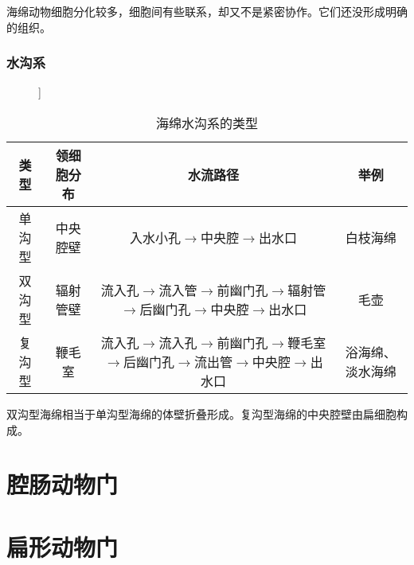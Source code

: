 海绵动物细胞分化较多，细胞间有些联系，却又不是紧密协作。它们还没形成明确的组织。

\subsubsection{水沟系}

\begin{figure}[h]
	\centering
	\begin{forest}
		[水沟系
			[单沟型]
			[双沟型]
			[复沟型]]
	\end{forest}
\end{figure}

\begin{table}[htbp]
	\centering
	\begin{tabularx}{\textwidth}{|c|c|C|c|}
		\hline
		类型 & 领细胞分布 & 水流路径 & 举例 \\ \hline
		单沟型 & 中央腔壁 & 入水小孔$\longrightarrow$中央腔$\longrightarrow$出水口 & 白枝海绵 \\ \hline
		双沟型 & 辐射管壁 & 流入孔$\longrightarrow$流入管$\longrightarrow$前幽门孔$\longrightarrow$辐射管$\longrightarrow$后幽门孔$\longrightarrow$中央腔$\longrightarrow$出水口 & 毛壶 \\ \hline
		复沟型 & 鞭毛室 & 流入孔$\longrightarrow$流入孔$\longrightarrow$前幽门孔$\longrightarrow$鞭毛室$\longrightarrow$后幽门孔$\longrightarrow$流出管$\longrightarrow$中央腔$\longrightarrow$出水口 & 浴海绵、淡水海绵 \\ \hline
	\end{tabularx}
	\caption{海绵水沟系的类型}
	\label{tab:sponge_canal}
\end{table}

双沟型海绵相当于单沟型海绵的体壁折叠形成。复沟型海绵的中央腔壁由扁细胞构成。
\section{腔肠动物门}

\section{扁形动物门}

